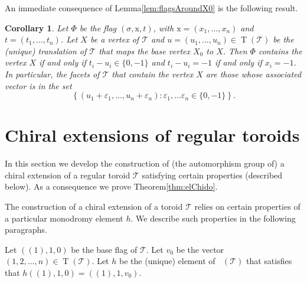 \documentclass[final]{amsart}
\theoremstyle{plain}
\newtheorem{coro}[thm]{Corollary}
\theoremstyle{definition}
\theoremstyle{remark}
\numberwithin{equation}{section}
\renewcommand{\epsilon}{\varepsilon} \renewcommand{\subset}{\subseteq} \renewcommand{\supset}{\supseteq} \renewcommand{\subsetneq}{\varsubsetneq}
\renewcommand{\{}{\lbrace}
\renewcommand{\}}{\rbrace}
\newcommand{\cT}{\mathcal{T}}
\newcommand{\cyvec}[1]{{\mathrm{#1}}}
\newcommand{\vx}{\cyvec{x}}
\DeclareMathOperator{\mon}{Mon}
\DeclareMathOperator{\monp}{\mon^{+}}
\DeclareMathOperator{\tras}{T}
\newcommand{\kng}{{h}}
\begin{document}
An immediate consequence of Lemma\nobreakspace \ref {lem:flagsAroundX0} is the following result.

\begin{coro}
\label{coro:facetsAroundAnyVertex}
Let $\Phi$ be the flag $(\sigma, \vx, t)$, with $\vx=(x_{1}, \dots, x_{n})$ and $t= (t_{1}, \dots, t_{n})$. 
Let $X$ be a vertex of $\cT$ and $u = (u_1, \dots, u_n) \in \tras(\cT)$ be the (unique) translation of $\cT$ that maps the base vertex $X_0$ to $X$.
Then $\Phi$ contains the vertex $X$ if and only if $t_i-u_i \in \{0, -1\}$ and $t_i -u_i = -1$ if and only if $x_i=-1$.
In particular, the facets of $\cT$ that contain the vertex $X$ are those whose associated vector is in the set \[\left\{(u_1 + \epsilon_1, \dots, u_n + \epsilon_n) : \epsilon_1, \dots \epsilon_n \in \{0,-1\} \right\}.\]
\end{coro}

























 \section{Chiral extensions of regular toroids}\label{sec:chirExtRegToroids}

In this section we develop the construction of (the automorphism group of) a chiral extension of a regular toroid $\cT$ satisfying certain properties (described below).
As a consequence we prove Theorem\nobreakspace \ref {thm:elChido}.


The construction of a chiral extension of a toroid $\cT$ relies on certain properties of a particular monodromy element $\kng$.
We describe such properties in the following paragraphs.

Let $((1), \cyvec{1},0)$ be the base flag of $\cT$.
Let $v_{0}$ 
be the vector $(1,2,\dots,n) \in \tras(\cT)$.
Let $\kng$ be the (unique) element of $\monp(\cT)$ that satisfies that $\kng ((1), \cyvec{1},0) = ( (1), \cyvec{1}, v_{0})$.
\end{document}
